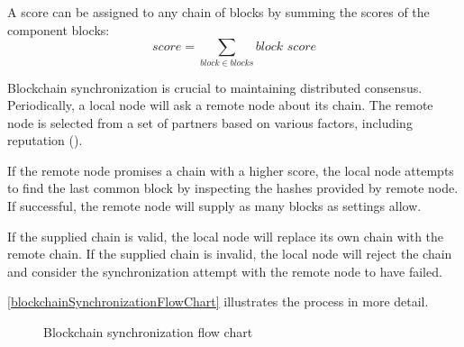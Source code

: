 A score can be assigned to any chain of blocks by summing the scores of the component blocks:
\begin{equation}
\tag{blockchain score} \mathit{score} = \sum_{block \in blocks} \textit{block score}
\end{equation}

Blockchain synchronization is crucial to maintaining distributed consensus.
Periodically, a local node will ask a remote node about its chain.
The remote node is selected from a set of partners based on various factors, including reputation ().

If the remote node promises a chain with a higher score, the local node attempts to find the last common block by inspecting the hashes provided by remote node.
If successful, the remote node will supply as many blocks as settings allow.

If the supplied chain is valid, the local node will replace its own chain with the remote chain.
If the supplied chain is invalid, the local node will reject the chain and consider the synchronization attempt with the remote node to have failed.

\autoref{blockchainSynchronizationFlowChart} illustrates the process in more detail.

\begin{figure}
	\begin{center}
		
		\caption{Blockchain synchronization flow chart}
	\end{center}
	\label{blockchainSynchronizationFlowChart}
\end{figure}
